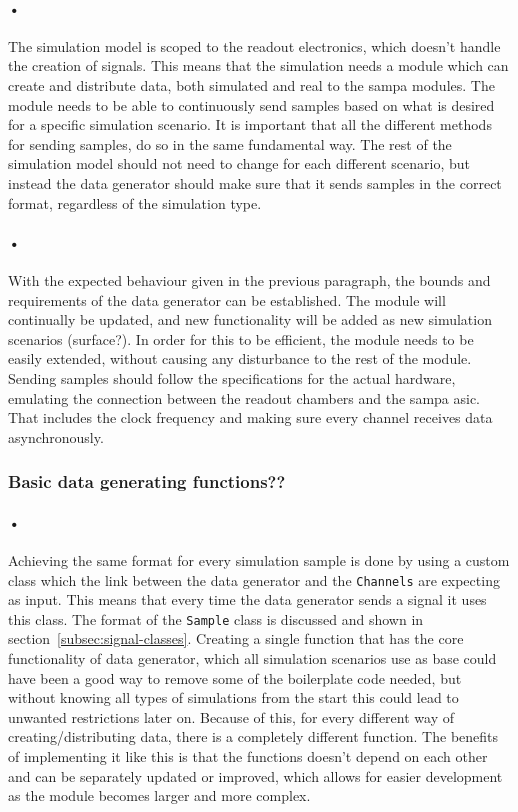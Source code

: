 \documentclass[a4paper, 12pt]{report}
\newcommand{\codeword}[1]{\texttt{#1}}
\begin{document}
\paragraph{•}
The simulation model is scoped to the readout electronics, which doesn't handle the creation of signals.
This means that the simulation needs a module which can create and distribute data, both simulated and real to the \gls{sampa} modules.
The module needs to be able to continuously send samples based on what is desired for a specific simulation scenario.
It is important that all the different methods for sending samples, do so in the same fundamental way.
The rest of the simulation model should not need to change for each different scenario, but instead the data generator should make sure that it sends samples in the correct format, regardless of the simulation type.

\paragraph{•}
With the expected behaviour given in the previous paragraph, the bounds and requirements of the data generator can be established.
The module will continually be updated, and new functionality will be added as new simulation scenarios (surface?). 
In order for this to be efficient, the module needs to be easily extended, without causing any disturbance to the rest of the module.
Sending samples should follow the specifications for the actual hardware, emulating the connection between the readout chambers and the \gls{sampa} asic.
That includes the clock frequency and making sure every channel receives data asynchronously.

\subsubsection{Basic data generating functions??}

\paragraph{•}
Achieving the same format for every simulation sample is done by using a custom class which the link between the data generator and the \codeword{Channels} are expecting as input.
This means that every time the data generator sends a signal it uses this class.
The format of the \codeword{Sample} class is discussed and shown in section~\ref{subsec:signal-classes}.
Creating a single function that has the core functionality of data generator, which all simulation scenarios use as base could have been a good way to remove some of the boilerplate code needed, but without knowing all types of simulations from the start this could lead to unwanted restrictions later on.
Because of this, for every different way of creating/distributing data, there is a completely different function.
The benefits of implementing it like this is that the functions doesn't depend on each other and can be separately updated or improved, which allows for easier development as the module becomes larger and more complex.
\end{document}
